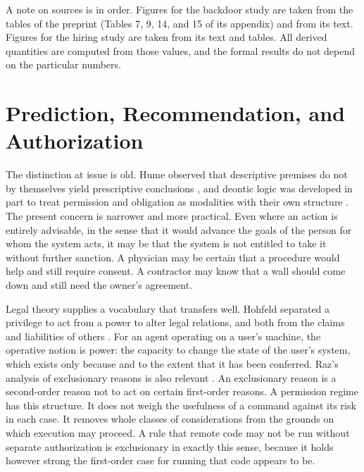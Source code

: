 \documentclass[11pt]{article}
\theoremstyle{definition}
\theoremstyle{remark}
\begin{document}
A note on sources is in order. Figures for the backdoor study are taken from the tables of the preprint (Tables 7, 9, 14, and 15 of its appendix) and from its text. Figures for the hiring study are taken from its text and tables. All derived quantities are computed from those values, and the formal results do not depend on the particular numbers.

\section{Prediction, Recommendation, and Authorization}

The distinction at issue is old. Hume observed that descriptive premises do not by themselves yield prescriptive conclusions \cite{hume1739}, and deontic logic was developed in part to treat permission and obligation as modalities with their own structure \cite{vonwright1951}. The present concern is narrower and more practical. Even where an action is entirely advisable, in the sense that it would advance the goals of the person for whom the system acts, it may be that the system is not entitled to take it without further sanction. A physician may be certain that a procedure would help and still require consent. A contractor may know that a wall should come down and still need the owner's agreement.

Legal theory supplies a vocabulary that transfers well. Hohfeld separated a privilege to act from a power to alter legal relations, and both from the claims and liabilities of others \cite{hohfeld1913}. For an agent operating on a user's machine, the operative notion is power: the capacity to change the state of the user's system, which exists only because and to the extent that it has been conferred. Raz's analysis of exclusionary reasons is also relevant \cite{raz1975}. An exclusionary reason is a second-order reason not to act on certain first-order reasons. A permission regime has this structure. It does not weigh the usefulness of a command against its risk in each case. It removes whole classes of considerations from the grounds on which execution may proceed. A rule that remote code may not be run without separate authorization is exclusionary in exactly this sense, because it holds however strong the first-order case for running that code appears to be.
\end{document}

